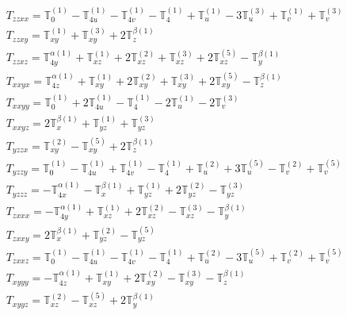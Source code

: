 \documentclass[fleqn,8pt,landscape]{jsarticle}
\begin{document}
\begin{align*}
& T_{zzxx} = \mathbb{T}_{0}^{(1)} - \mathbb{T}_{4u}^{(1)} - \mathbb{T}_{4v}^{(1)} - \mathbb{T}_{4}^{(1)} + \mathbb{T}_{u}^{(1)} - 3 \mathbb{T}_{u}^{(3)} + \mathbb{T}_{v}^{(1)} + \mathbb{T}_{v}^{(3)} \\
& T_{zzxy} = \mathbb{T}_{xy}^{(1)} + \mathbb{T}_{xy}^{(3)} + 2 \mathbb{T}_{z}^{\beta(1)} \\
& T_{zzxz} = \mathbb{T}_{4y}^{\alpha(1)} + \mathbb{T}_{xz}^{(1)} + 2 \mathbb{T}_{xz}^{(2)} + \mathbb{T}_{xz}^{(3)} + 2 \mathbb{T}_{xz}^{(5)} - \mathbb{T}_{y}^{\beta(1)} \\
& T_{xxyx} = \mathbb{T}_{4z}^{\alpha(1)} + \mathbb{T}_{xy}^{(1)} + 2 \mathbb{T}_{xy}^{(2)} + \mathbb{T}_{xy}^{(3)} + 2 \mathbb{T}_{xy}^{(5)} - \mathbb{T}_{z}^{\beta(1)} \\
& T_{xxyy} = \mathbb{T}_{0}^{(1)} + 2 \mathbb{T}_{4u}^{(1)} - \mathbb{T}_{4}^{(1)} - 2 \mathbb{T}_{u}^{(1)} - 2 \mathbb{T}_{v}^{(3)} \\
& T_{xxyz} = 2 \mathbb{T}_{x}^{\beta(1)} + \mathbb{T}_{yz}^{(1)} + \mathbb{T}_{yz}^{(3)} \\
& T_{yzzx} = \mathbb{T}_{xy}^{(2)} - \mathbb{T}_{xy}^{(5)} + 2 \mathbb{T}_{z}^{\beta(1)} \\
& T_{yzzy} = \mathbb{T}_{0}^{(1)} - \mathbb{T}_{4u}^{(1)} + \mathbb{T}_{4v}^{(1)} - \mathbb{T}_{4}^{(1)} + \mathbb{T}_{u}^{(2)} + 3 \mathbb{T}_{u}^{(5)} - \mathbb{T}_{v}^{(2)} + \mathbb{T}_{v}^{(5)} \\
& T_{yzzz} = - \mathbb{T}_{4x}^{\alpha(1)} - \mathbb{T}_{x}^{\beta(1)} + \mathbb{T}_{yz}^{(1)} + 2 \mathbb{T}_{yz}^{(2)} - \mathbb{T}_{yz}^{(3)} \\
& T_{zxxx} = - \mathbb{T}_{4y}^{\alpha(1)} + \mathbb{T}_{xz}^{(1)} + 2 \mathbb{T}_{xz}^{(2)} - \mathbb{T}_{xz}^{(3)} - \mathbb{T}_{y}^{\beta(1)} \\
& T_{zxxy} = 2 \mathbb{T}_{x}^{\beta(1)} + \mathbb{T}_{yz}^{(2)} - \mathbb{T}_{yz}^{(5)} \\
& T_{zxxz} = \mathbb{T}_{0}^{(1)} - \mathbb{T}_{4u}^{(1)} - \mathbb{T}_{4v}^{(1)} - \mathbb{T}_{4}^{(1)} + \mathbb{T}_{u}^{(2)} - 3 \mathbb{T}_{u}^{(5)} + \mathbb{T}_{v}^{(2)} + \mathbb{T}_{v}^{(5)} \\
& T_{xyyy} = - \mathbb{T}_{4z}^{\alpha(1)} + \mathbb{T}_{xy}^{(1)} + 2 \mathbb{T}_{xy}^{(2)} - \mathbb{T}_{xy}^{(3)} - \mathbb{T}_{z}^{\beta(1)} \\
& T_{xyyz} = \mathbb{T}_{xz}^{(2)} - \mathbb{T}_{xz}^{(5)} + 2 \mathbb{T}_{y}^{\beta(1)}
\end{align*}
\end{document}
